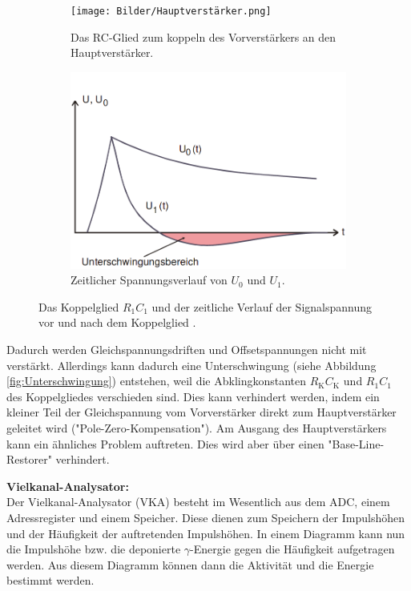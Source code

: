 \begin{figure}[H]
	\centering
	\begin{subfigure}[t]{0.49\linewidth}
		\texttt{[image: Bilder/Hauptverstärker.png]}
		\caption{Das RC-Glied zum koppeln des Vorverstärkers an den Hauptverstärker.}
		\label{fig:Hauptverstärker}
	\end{subfigure}
	\hfill
	\begin{subfigure}[t]{0.49\linewidth}
		\includegraphics[width=\textwidth]{Bilder/Unterschwingung.png}
		\caption{Zeitlicher Spannungsverlauf von $U_0$ und $U_1$.}
		\label{fig:Unterschwingung}
	\end{subfigure}
  \caption{Das Koppelglied $R_1C_1$ und der zeitliche Verlauf der Signalspannung vor und nach dem Koppelglied \cite{V18}.}
\end{figure}

Dadurch werden Gleichspannungsdriften und Offsetspannungen nicht mit verstärkt. Allerdings kann dadurch eine Unterschwingung (siehe Abbildung \eqref{fig:Unterschwingung}) entstehen, weil die Abklingkonstanten $R_\text{K}C_\text{K}$ und $R_1C_1$ des Koppelgliedes verschieden sind. Dies kann verhindert werden, indem ein kleiner Teil der Gleichspannung vom Vorverstärker direkt zum Hauptverstärker geleitet wird ("Pole-Zero-Kompensation"). Am Ausgang des Hauptverstärkers kann ein ähnliches Problem auftreten. Dies wird aber über einen "Base-Line-Restorer" verhindert.

\textbf{Vielkanal-Analysator:} \\
Der Vielkanal-Analysator (VKA) besteht im Wesentlich aus dem ADC, einem Adressregister und einem Speicher. Diese dienen zum Speichern der Impulshöhen und der Häufigkeit der auftretenden Impulshöhen. In einem Diagramm kann nun die Impulshöhe bzw. die deponierte $\gamma$-Energie gegen die Häufigkeit aufgetragen werden. Aus diesem Diagramm können dann die Aktivität und die Energie bestimmt werden. \\



